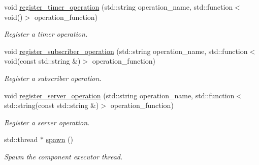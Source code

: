 \begin{DoxyCompactItemize}
void \hyperlink{classzcm_1_1Component_a64cab31bccfdd710f217e6a576113ce7}{register\+\_\+timer\+\_\+operation} (std\+::string operation\+\_\+name, std\+::function$<$ void()$>$ operation\+\_\+function)
\begin{DoxyCompactList}\small\item\em Register a timer operation. \end{DoxyCompactList}\item 
void \hyperlink{classzcm_1_1Component_af0396ef5ac1da1119e645d0e30ca07c8}{register\+\_\+subscriber\+\_\+operation} (std\+::string operation\+\_\+name, std\+::function$<$ void(const std\+::string \&)$>$ operation\+\_\+function)
\begin{DoxyCompactList}\small\item\em Register a subscriber operation. \end{DoxyCompactList}\item 
void \hyperlink{classzcm_1_1Component_a7701fdcd7e012b9cf372aa1755ee6d6c}{register\+\_\+server\+\_\+operation} (std\+::string operation\+\_\+name, std\+::function$<$ std\+::string(const std\+::string \&)$>$ operation\+\_\+function)
\begin{DoxyCompactList}\small\item\em Register a server operation. \end{DoxyCompactList}\item 
std\+::thread $\ast$ \hyperlink{classzcm_1_1Component_a328d6f79aab5455e96a2badfdb6bb451}{spawn} ()
\begin{DoxyCompactList}\small\item\em Spawn the component executor thread. \end{DoxyCompactList}\end{DoxyCompactItemize}

